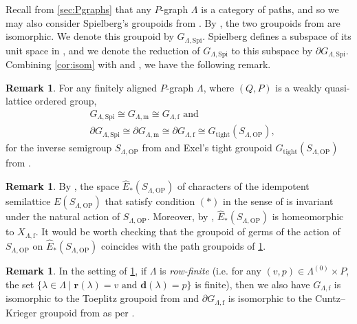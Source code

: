 \documentclass[11pt]{amsart}
\theoremstyle{definition}
\numberwithin{thm}{section}
\numberwithin{equation}{section}
\newtheorem{remark}[thm]{Remark}
\newcommand{\Define}[1]{\emph{#1}}
\newcommand{\setof}[2]{\{ #1 \mid #2 \}}
\newcommand{\range}{\mathbf{r}}
\newcommand{\degree}{\mathbf{d}}
\newcommand{\ofSpielberg}{\mathrm{Spi}}
\newcommand{\ofOP}{\mathrm{OP}}
\newcommand{\M}{\mathrm{m}}
\newcommand{\F}{\mathrm{f}}
\newcommand{\PS}[2]{X_{#2, #1}}
\newcommand{\PG}[2]{{G_{#2, #1}}}
\newcommand{\BPG}[2]{\partial\PG{#1}{#2}}
\newcommand{\tightgpd}{G_\mathrm{tight}}
\newcommand{\unitspace}[1]{#1^{(0)}}
\begin{document}
Recall from \cref{sec:Pgraphs} that any $P$-graph $\Lambda$ is a category of paths, and so we may also consider Spielberg's groupoids from \cite{Spi20}. 
By \cite[Proposition 5.11]{Spi20}, the two groupoids from \cite[Definition 5.5(iii)]{Spi20} are isomorphic. 
We denote this groupoid by $\PG{\ofSpielberg}{\Lambda}$.
Spielberg defines a subspace of its unit space in \cite[Definition 10.2]{Spi20}, and we denote the reduction of $\PG{\ofSpielberg}{\Lambda}$ to this subspace by $\BPG{\ofSpielberg}{\Lambda}$.
Combining \cref{cor:isom} with \cite[Corollary 4.14 and Proposition 5.2]{OP20} and \cite[Theorem 6.6 and Corollary 6.8]{Jon26}, we have the following remark.

\begin{remark}
\label{rem:gpd_isoms_for_Pgraphs}
For any finitely aligned $P$-graph $\Lambda$, where $(Q, P)$ is a weakly quasi-lattice ordered group,
\begin{align*}
&\PG{\ofSpielberg}{\Lambda} 
\cong \PG{\M}{\Lambda} 
\cong \PG{\F}{\Lambda} \text{ and } \\
&\BPG{\ofSpielberg}{\Lambda}
\cong \BPG{\M}{\Lambda}
\cong \BPG{\F}{\Lambda} 
\cong \tightgpd(S_{\Lambda, \ofOP}),
\end{align*}
for the inverse semigroup $S_{\Lambda, \ofOP}$ from \cite[Definition 2.2]{OP20} and Exel's tight groupoid $\tightgpd(S_{\Lambda, \ofOP})$ from \cite{Exe08}.
\end{remark}

\begin{remark}
By \cite[Lemma 4.4]{OP20}, the space $\hat{E}_*(S_{\Lambda, \ofOP})$ of characters of the idempotent semilattice $E(S_{\Lambda, \ofOP})$ that satisfy condition $(*)$ in the sense of \cite[Definition 3.15]{OP20} is invariant under the natural action of $S_{\Lambda, \ofOP}$. 
Moreover, by \cite[Corollary 3.16]{OP20}, $\hat{E}_*(S_{\Lambda, \ofOP})$ is homeomorphic to $\PS{\F}{\Lambda}$. 
It would be worth checking that the groupoid of germs of the action of $S_{\Lambda, \ofOP}$ on $\hat{E}_*(S_{\Lambda, \ofOP})$ coincides with the path groupoids of \cref{rem:gpd_isoms_for_Pgraphs}.
\end{remark}

\begin{remark}
\label{rem:gpd_isoms_for_Pgraphs_row_finite}
In the setting of \cref{rem:gpd_isoms_for_Pgraphs}, if $\Lambda$ is \Define{row-finite} (i.e. for any $(v, p) \in \unitspace{\Lambda} \times P$, the set $\setof{\lambda \in \Lambda}{\range(\lambda) = v \text{ and } \degree(\lambda) = p}$ is finite), then we also have $\PG{\F}{\Lambda}$ is isomorphic to the Toeplitz groupoid from \cite[Definition 6.11]{RW17} and $\BPG{\F}{\Lambda}$ is isomorphic to the Cuntz--Krieger groupoid from \cite[Definition 6.18]{RW17} as per \cite[Remark 6.7]{Jon26}.
\end{remark}
\end{document}

